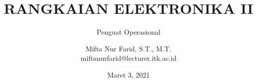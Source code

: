 \documentclass[aspectratio=169]{beamer}
\author{Mifta Nur Farid, S.T., M.T. \\
	miftanurfarid@lecturer.itk.ac.id}
\title{RANGKAIAN ELEKTRONIKA II}
\subtitle{Penguat Operasional}
\institute{Teknik Elektro \\ Institut Teknologi Kalimantan \\ Balikpapan, Indonesia}
\date{\tiny Maret 3, 2021}
\begin{document}
\begin{frame}[t,plain]
\titlepage
\end{frame}









\end{document}
